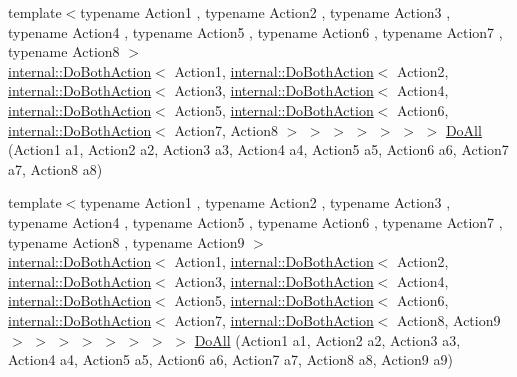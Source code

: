 \begin{DoxyCompactItemize}
\item 
{\footnotesize template$<$typename Action1 , typename Action2 , typename Action3 , typename Action4 , typename Action5 , typename Action6 , typename Action7 , typename Action8 $>$ }\\\mbox{\hyperlink{classtesting_1_1internal_1_1DoBothAction}{internal\+::\+Do\+Both\+Action}}$<$ Action1, \mbox{\hyperlink{classtesting_1_1internal_1_1DoBothAction}{internal\+::\+Do\+Both\+Action}}$<$ Action2, \mbox{\hyperlink{classtesting_1_1internal_1_1DoBothAction}{internal\+::\+Do\+Both\+Action}}$<$ Action3, \mbox{\hyperlink{classtesting_1_1internal_1_1DoBothAction}{internal\+::\+Do\+Both\+Action}}$<$ Action4, \mbox{\hyperlink{classtesting_1_1internal_1_1DoBothAction}{internal\+::\+Do\+Both\+Action}}$<$ Action5, \mbox{\hyperlink{classtesting_1_1internal_1_1DoBothAction}{internal\+::\+Do\+Both\+Action}}$<$ Action6, \mbox{\hyperlink{classtesting_1_1internal_1_1DoBothAction}{internal\+::\+Do\+Both\+Action}}$<$ Action7, Action8 $>$ $>$ $>$ $>$ $>$ $>$ $>$ \mbox{\hyperlink{namespacetesting_a2c0e69056a8e5bc4ddc2308ba0af5214}{Do\+All}} (Action1 a1, Action2 a2, Action3 a3, Action4 a4, Action5 a5, Action6 a6, Action7 a7, Action8 a8)
\item 
{\footnotesize template$<$typename Action1 , typename Action2 , typename Action3 , typename Action4 , typename Action5 , typename Action6 , typename Action7 , typename Action8 , typename Action9 $>$ }\\\mbox{\hyperlink{classtesting_1_1internal_1_1DoBothAction}{internal\+::\+Do\+Both\+Action}}$<$ Action1, \mbox{\hyperlink{classtesting_1_1internal_1_1DoBothAction}{internal\+::\+Do\+Both\+Action}}$<$ Action2, \mbox{\hyperlink{classtesting_1_1internal_1_1DoBothAction}{internal\+::\+Do\+Both\+Action}}$<$ Action3, \mbox{\hyperlink{classtesting_1_1internal_1_1DoBothAction}{internal\+::\+Do\+Both\+Action}}$<$ Action4, \mbox{\hyperlink{classtesting_1_1internal_1_1DoBothAction}{internal\+::\+Do\+Both\+Action}}$<$ Action5, \mbox{\hyperlink{classtesting_1_1internal_1_1DoBothAction}{internal\+::\+Do\+Both\+Action}}$<$ Action6, \mbox{\hyperlink{classtesting_1_1internal_1_1DoBothAction}{internal\+::\+Do\+Both\+Action}}$<$ Action7, \mbox{\hyperlink{classtesting_1_1internal_1_1DoBothAction}{internal\+::\+Do\+Both\+Action}}$<$ Action8, Action9 $>$ $>$ $>$ $>$ $>$ $>$ $>$ $>$ \mbox{\hyperlink{namespacetesting_a3479e234532d82d0a093f7ffdb3ac254}{Do\+All}} (Action1 a1, Action2 a2, Action3 a3, Action4 a4, Action5 a5, Action6 a6, Action7 a7, Action8 a8, Action9 a9)
\item 

\end{DoxyCompactItemize}
